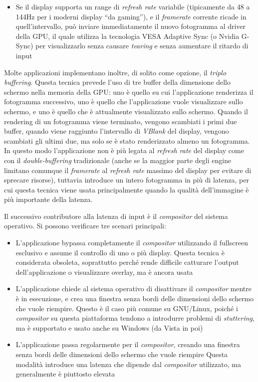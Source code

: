\begin{itemize}
\begin{itemize}
		\item Se il display supporta un range di \textit{refresh rate} variabile (tipicamente da 48 a 144Hz per i moderni display ``da gaming''), e il \textit{framerate} corrente ricade in quell'intervallo, può inviare immediatamente il nuovo fotogramma al driver della GPU, il quale utilizza la tecnologia VESA Adaptive Sync (o Nvidia G-Sync) per visualizzarlo senza causare \textit{tearing} e senza aumentare il ritardo di input
	\end{itemize}
	Molte applicazioni implementano inoltre, di solito come opzione, il \textit{triplo buffering}. Questa tecnica prevede l'uso di tre buffer della dimensione dello schermo nella memoria della GPU: uno è quello su cui l'applicazione renderizza il fotogramma successivo, uno è quello che l'applicazione vuole visualizzare sullo schermo, e uno è quello che è attualmente visualizzato sullo schermo. Quando il rendering di un fotogramma viene terminato, vengono scambiati i primi due buffer, quando viene raggiunto l'intervallo di \textit{VBlank} del display, vengono scambiati gli ultimi due, ma solo se è stato renderizzato almeno un fotogramma. In questo modo l'applicazione non è più legata al \textit{refresh rate} del display come con il \textit{double-buffering} tradizionale (anche se la maggior parte degli engine limitano comunque il \textit{framerate} al \textit{refresh rate} massimo del display per evitare di sprecare risorse), tuttavia introduce un intero fotogramma in più di latenza, per cui questa tecnica viene usata principalmente quando la qualità dell'immagine è più importante della latenza.
\end{itemize}

Il successivo contributore alla latenza di input è il \textit{compositor} del sistema operativo. Si possono verificare tre scenari principali:
\begin{itemize}
	\item L'applicazione bypassa completamente il \textit{compositor} utilizzando il fullscreen esclusivo e assume il controllo di uno o più display. Questa tecnica è considerata obsoleta, soprattutto perché rende difficile catturare l'output dell'applicazione o visualizzare overlay, ma è ancora usata
	\item L'applicazione chiede al sistema operativo di disattivare il \textit{compositor} mentre è in esecuzione, e crea una finestra senza bordi delle dimensioni dello schermo che vuole riempire. Questo è il caso più comune su GNU/Linux, poiché i \textit{compositor} su questa piattaforma tendono a introdurre problemi di \textit{stuttering}, ma è supportato e usato anche su Windows (da Vista in poi)
	\item L'applicazione passa regolarmente per il \textit{compositor}, creando una finestra senza bordi delle dimensioni dello schermo che vuole riempire Questa modalità introduce una latenza che dipende dal \textit{compositor} utilizzato, ma generalmente è piuttosto elevata
\end{itemize}

